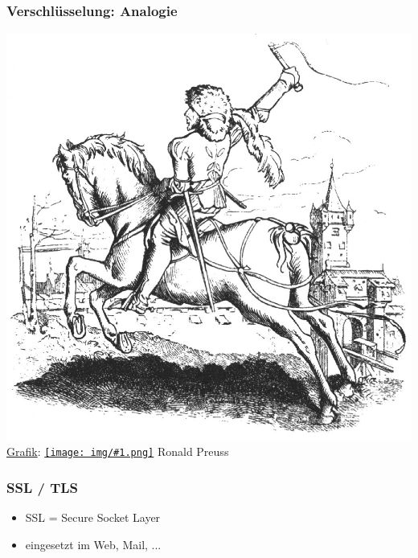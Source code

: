 \documentclass[12pt]{beamer}
\newcommand{\cc}[1]{\texttt{[image: img/\#1.png]}\hspace{1mm}}
\begin{document}
\subsection{}

\begin{frame}
    \frametitle{Verschlüsselung: Analogie}
    \includegraphics[height=0.7\textheight]{img/bote.jpg}
    {\\ \small \href{http://commons.wikimedia.org/wiki/File:Reitbote.jpg}{Grafik}: \href{http://creativecommons.org/licenses/by-sa/2.5/deed.en}{\cc{by-sa}} Ronald Preuss}
\end{frame}


\begin{frame}
    \frametitle{SSL / TLS}
    \begin{itemize}
      \item<2-> SSL = Secure Socket Layer
      \item<3-> eingesetzt im Web, Mail, ...
    \end{itemize}
\end{frame}
\end{document}
